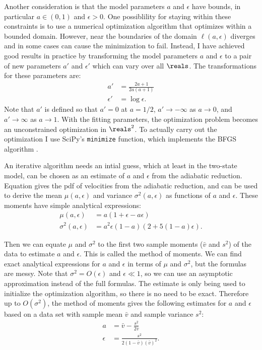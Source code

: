 Another consideration is that the model parameters $a$ and $\epsilon$
have bounds, in particular $a \in (0, 1)$ and $\epsilon > 0$. One
possiblility for staying within these constraints is to use a
numerical optimization algorithm that optimizes within a bounded
domain. However, near the boundaries of the domain $\ell(a, \epsilon)$
diverges and in some cases can cause the minimization to
fail. Instead, I have achieved good results in practice by
transforming the model parameters $a$ and $\epsilon$ to a pair of new
parameters $a'$ and $\epsilon'$ which can vary over all $\reals$. The
transformations for these parameters are:
\begin{align}
  \label{eq:a-fwd-trns}
  a' &= \frac{2a + 1}{2a(a + 1)} \\
  \label{eq:e-fwd-trns}
  \epsilon' &= \log \epsilon.
\end{align}
Note that $a'$ is defined so that $a'=0$ at $a=1/2$,
$a' \rightarrow -\infty$ as $a \rightarrow 0$, and
$a' \rightarrow \infty$ as $a \rightarrow 1$. With the fitting
parameters, the optimization problem becomes an unconstrained
optimization in $\reals^2$. To actually carry out the optimization I
use SciPy's \cite{Virtanen2020} \verb|minimize| function, which
implements the BFGS algorithm .

An iterative algorithm needs an intial guess, which at least in the
two-state model, can be chosen as an estimate of $a$ and $\epsilon$
from the adiabatic reduction. Equation  gives the
pdf of velocities from the adiabatic reduction, and can be used to
derive the mean $\mu(a, \epsilon)$ and variance $\sigma^2(a,
\epsilon)$ as functions of $a$ and $\epsilon$. These moments have
simple analytical expressions: 
\begin{align}
  \label{eq:mean-ar}
  \mu(a, \epsilon) &= a(1 + \epsilon - a \epsilon) \\
  \label{eq:var-ar}
  \sigma^2(a, \epsilon) &= a^2 \epsilon (1 - a) (2 + 5(1 - a) \epsilon).
\end{align}

Then we can equate $\mu$ and $\sigma^2$ to the first two sample
moments ($\bar{v}$ and $s^2$) of the data to estimate $a$ and
$\epsilon$. This is called the method of moments. We can find exact
analytical expressions for $a$ and $\epsilon$ in terms of $\mu$ and
$\sigma^2$, but the formulas are messy. Note that
$\sigma^2 = O(\epsilon)$ and $\epsilon \ll 1$, so we can use an
asymptotic approximation instead of the full formulas. The estimate is
only being used to initialize the optimization algorithm, so there is
no need to be exact. Therefore up to $O(\sigma^2)$, the method of
moments gives the following estimates for $a$ and $\epsilon$ based on
a data set with sample mean $\bar{v}$ and sample variance $s^2$:
\begin{align}
  \label{eq:mean-est}
  a &= \bar{v} - \frac{s^2}{2\bar{v}} \\
  \label{eq:var-est}
  \epsilon &= \frac{s^2}{2(1 - \bar{v})(\bar{v})^2}.
\end{align}

